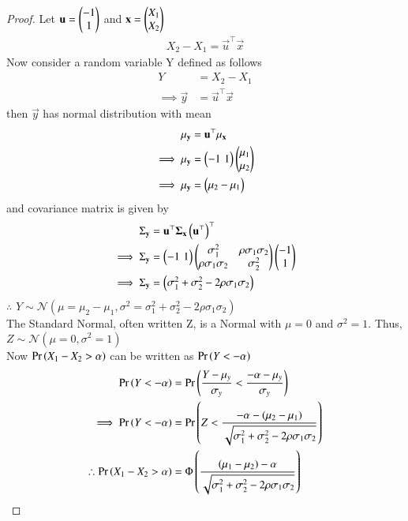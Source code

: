 \documentclass[journal,12pt,twocolumn]{IEEEtran}
\begin{document}
\begin{proof}
    Let $\mathbf{u}=\begin{pmatrix}-1\\
                        1\end{pmatrix}$ and $\mathbf{x}=\begin{pmatrix}X_1\\
                                            X_2\end{pmatrix}$ 
    \begin{align}
        X_2-X_1=\vec{u}^{\top}\vec{x}
    \end{align}
    Now consider a random variable Y defined as follows
    \begin{align}
        Y&=X_2-X_1\\
        \implies \vec{y}&=\vec{u}^{\top}\vec{x}
    \end{align}
    then $\vec{y}$ has normal distribution with mean
    \begin{align}
        \mu_{\mathbf{y}}&=\mathbf{u}^{\top}\mathbf{\mu_{\mathbf{x}}}\\
        \implies \mu_{\mathbf{y}}&=\begin{pmatrix}-1\,\,1\end{pmatrix}\begin{pmatrix}\mu_1\\
                                                      \mu_2\end{pmatrix}\\
        \implies \mu_{\mathbf{y}}&=\begin{pmatrix}\mu_2-\mu_1\end{pmatrix}
    \end{align}
    and covariance matrix is given by
    \begin{align}
        \Sigma_{\mathbf{y}}&=\mathbf{u}^{\top}\mathbf{\Sigma_{\mathbf{x}}}\left(\mathbf{u}^{\top}\right)^{\top}\\
        \implies \Sigma_{\mathbf{y}}&=\begin{pmatrix}-1\,\,1\end{pmatrix}\begin{pmatrix}\sigma^2_1&\rho\sigma_1\sigma_2\\
                                                         \rho\sigma_1\sigma_2&\sigma^2_2\end{pmatrix}\begin{pmatrix}-1\\
                                                                                                1\end{pmatrix}\\
        \implies \Sigma_{\mathbf{y}}&=\begin{pmatrix}\sigma^2_1+\sigma^2_2-2\rho\sigma_1\sigma_2\end{pmatrix}                
    \end{align}
    $\therefore$ $Y\sim\mathcal{N}(\mu=\mu_2-\mu_1,\sigma^2=\sigma^2_1+\sigma^2_2-2\rho\sigma_1\sigma_2)$\\
    
    The Standard Normal, often written Z, is a Normal with $\mu=0$ and $\sigma^2=1$. Thus, $Z \sim \mathcal{N}(\mu=0,\sigma^2=1)$\\

    Now $\Pr\left(X_1-X_2>\alpha\right)$ can be written as $\Pr\left(Y<-\alpha\right)$\\
    
    \begin{align}
        \Pr\left(Y<-\alpha\right)&=\Pr\left(\frac{Y-\mu_y}{\sigma_y}<\frac{-\alpha-\mu_y}{\sigma_y}\right)\\
        \implies \Pr\left(Y<-\alpha\right)&=\Pr\left(Z<\frac{-\alpha-(\mu_2-\mu_1)}{\sqrt{\sigma^2_1+\sigma^2_2-2\rho\sigma_1\sigma_2}}\right)\\
        \therefore \Pr\left(X_1-X_2>\alpha\right)&=\Phi\left(\frac{(\mu_1-\mu_2)-\alpha}{\sqrt{\sigma^2_1+\sigma^2_2-2\rho\sigma_1\sigma_2}}\right)
    \end{align}
\end{proof}
\end{document}
